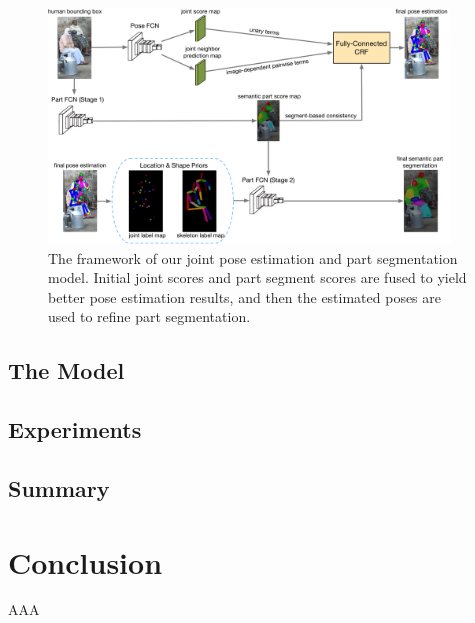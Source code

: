 \begin{figure}[!tb]
\begin{center}
   \includegraphics[width=0.95\textwidth]{figs/framework_v2_cvpr.pdf}
\end{center}
\caption{The framework of our joint pose estimation and part segmentation model. Initial joint scores and part segment scores are fused to yield better pose estimation results, and then the estimated poses are used to refine part segmentation.}
\label{fig:framework_cvpr}
\end{figure}

\subsection{The Model}

\subsection{Experiments}

\subsection{Summary}

\section{Conclusion}

\begin{acknowledgements}
AAA
\end{acknowledgements}


